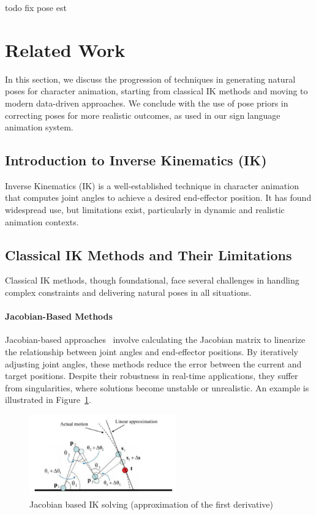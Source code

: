 \documentclass[../../main.tex]{subfiles}
\begin{document}
todo fix pose est 

\section{Related Work}
\label{ch:pose_correction:related_work}

In this section, we discuss the progression of techniques in generating natural poses for character animation, starting from classical IK methods and moving to modern data-driven approaches. We conclude with the use of pose priors in correcting poses for more realistic outcomes, as used in our sign language animation system.

\subsection{Introduction to Inverse Kinematics (IK)}
\label{ch:pose_correction:related_work:intro_ik}
Inverse Kinematics (IK) is a well-established technique in character animation that computes joint angles to achieve a desired end-effector position. It has found widespread use, but limitations exist, particularly in dynamic and realistic animation contexts.

\subsection{Classical IK Methods and Their Limitations}
\label{ch:pose_correction:related_work:classical_ik}
Classical IK methods, though foundational, face several challenges in handling complex constraints and delivering natural poses in all situations.

\paragraph{Jacobian-Based Methods} Jacobian-based approaches~\cite{4648032} involve calculating the Jacobian matrix to linearize the relationship between joint angles and end-effector positions. By iteratively adjusting joint angles, these methods reduce the error between the current and target positions. Despite their robustness in real-time applications, they suffer from singularities, where solutions become unstable or unrealistic. An example is illustrated in Figure~\ref{fig:jacobian_based}.

\begin{figure}
    \centering \includegraphics[width = 2.5in]{chapters/pose_correction/images/jacobian_based.png}
    \caption{Jacobian based IK solving (approximation of the first derivative)}
    \label{fig:jacobian_based}
\end{figure}
\end{document}
